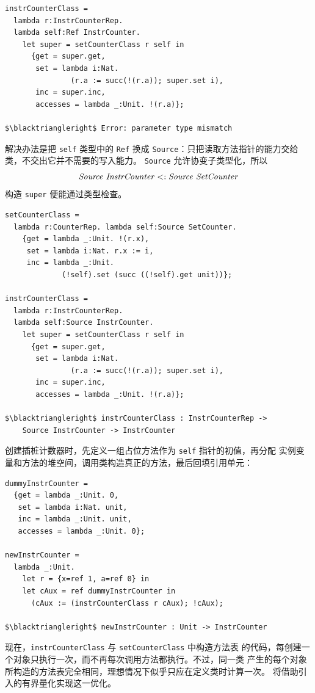 \begin{lstlisting}[mathescape=true]
instrCounterClass =
  lambda r:InstrCounterRep.
  lambda self:Ref InstrCounter.
    let super = setCounterClass r self in
      {get = super.get,
       set = lambda i:Nat.
               (r.a := succ(!(r.a)); super.set i),
       inc = super.inc,
       accesses = lambda _:Unit. !(r.a)};

$\blacktriangleright$ Error: parameter type mismatch
\end{lstlisting}

解决办法是把 \texttt{self} 类型中的 \texttt{Ref} 换成
\texttt{Source}：只把读取方法指针的能力交给类，不交出它并不需要的写入能力。
\texttt{Source} 允许协变子类型化，所以
\[
\mathit{Source}\ \mathit{InstrCounter}
  \mathrel{<:}
\mathit{Source}\ \mathit{SetCounter}
\]
构造 \texttt{super} 便能通过类型检查。

\begin{lstlisting}[mathescape=true]
setCounterClass =
  lambda r:CounterRep. lambda self:Source SetCounter.
    {get = lambda _:Unit. !(r.x),
     set = lambda i:Nat. r.x := i,
     inc = lambda _:Unit.
             (!self).set (succ ((!self).get unit))};

instrCounterClass =
  lambda r:InstrCounterRep.
  lambda self:Source InstrCounter.
    let super = setCounterClass r self in
      {get = super.get,
       set = lambda i:Nat.
               (r.a := succ(!(r.a)); super.set i),
       inc = super.inc,
       accesses = lambda _:Unit. !(r.a)};

$\blacktriangleright$ instrCounterClass : InstrCounterRep ->
    Source InstrCounter -> InstrCounter
\end{lstlisting}

创建插桩计数器时，先定义一组占位方法作为 \texttt{self} 指针的初值，再分配
实例变量和方法的堆空间，调用类构造真正的方法，最后回填引用单元：

\begin{lstlisting}[mathescape=true]
dummyInstrCounter =
  {get = lambda _:Unit. 0,
   set = lambda i:Nat. unit,
   inc = lambda _:Unit. unit,
   accesses = lambda _:Unit. 0};

newInstrCounter =
  lambda _:Unit.
    let r = {x=ref 1, a=ref 0} in
    let cAux = ref dummyInstrCounter in
      (cAux := (instrCounterClass r cAux); !cAux);

$\blacktriangleright$ newInstrCounter : Unit -> InstrCounter
\end{lstlisting}

现在，\texttt{instrCounterClass} 与 \texttt{setCounterClass} 中构造方法表
的代码，每创建一个对象只执行一次，而不再每次调用方法都执行。不过，同一类
产生的每个对象所构造的方法表完全相同，理想情况下似乎只应在定义类时计算一次。
将借助引入的有界量化实现这一优化。

